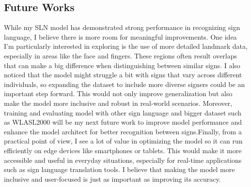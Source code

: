 \documentclass{article}
\begin{document}
\subsection{Future Works}
While my SLN model has demonstrated strong performance in recognizing sign language, I believe there is more room for meaningful improvements. One idea I’m particularly interested in exploring is the use of more detailed landmark data, especially in areas like the face and fingers. These regions often result overlaps that can make a big difference when distinguishing between similar signs. I also noticed that the model might struggle a bit with signs that vary across different individuals, so expanding the dataset to include more diverse signers could be an important step forward. This would not only improve generalization but also make the model more inclusive and robust in real-world scenarios. Moreover, training and evaluating model with other sign language and bigger dataset such as WLASL2000 will be my next future work to improve model performance and enhance the model architect for better recognition between signs.Finally, from a practical point of view, I see a lot of value in optimizing the model so it can run efficiently on edge devices like smartphones or tablets. This would make it more accessible and useful in everyday situations, especially for real-time applications such as sign language translation tools. I believe that making the model more inclusive and user-focused is just as important as improving its accuracy.

\newpage
\printbibliography
\end{document}
